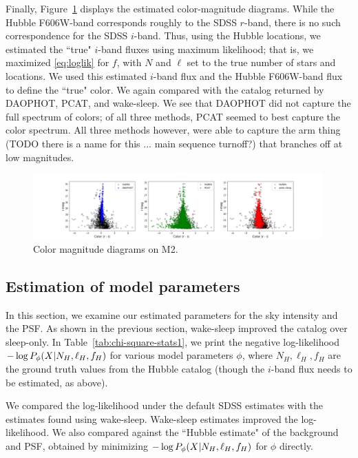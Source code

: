 Finally, Figure~\ref{fig:cmd_m2} displays the estimated color-magnitude diagrams. While the Hubble F606W-band corresponds roughly to the SDSS $r$-band, there is no such correspondence for the SDSS $i$-band. Thus, using the Hubble locations, we estimated the ``true" $i$-band fluxes using maximum likelihood; that is, we maximized \eqref{eq:loglik}
for $f$, with $N$ and $\ell$ set to the true number of stars and locations. We used this estimated $i$-band flux and the Hubble F606W-band flux to define the ``true" color. We again compared with the catalog returned by DAOPHOT, PCAT, and wake-sleep. We see that DAOPHOT did not capture the full spectrum of colors; of all three methods, PCAT seemed to best capture the color spectrum. All three methods however, were able to capture the arm thing (TODO there is a name for this ... main sequence turnoff?) that branches off at low magnitudes. 

\begin{figure}[ht]
    \centering
    \includegraphics[width=0.99\textwidth]{figures/cmd.png}
    \caption{Color magnitude diagrams on M2. }
    \label{fig:cmd_m2}
\end{figure}


\subsection{Estimation of model parameters}
\label{sec:results_model_params}
In this section, we examine our estimated parameters 
for the sky intensity and the PSF. As shown in the previous section, wake-sleep improved the catalog over sleep-only. In Table~\ref{tab:chi-square-stats1}, we
print the negative log-likelihood $- \log P_\phi(X | N_{H}, \ell_{H}, f_{H})$ for various model parameters $\phi$, where $N_{H}, \ell_{H}, f_{H}$ are the ground truth
values from the Hubble catalog (though the $i$-band flux needs to be estimated, as above). 

We compared the log-likelihood under the default SDSS estimates with the estimates found using wake-sleep. Wake-sleep estimates improved the log-likelihood. We also compared against the ``Hubble estimate" of the background and PSF, obtained by minimizing 
$- \log P_\phi(X | N_{H}, \ell_{H}, f_{H})$ for $\phi$ directly. 

